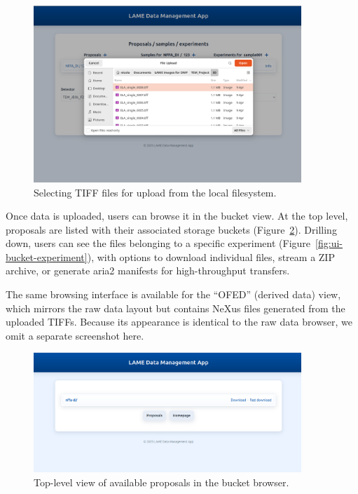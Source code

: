 \begin{figure}[!h]
	\centering
	\includegraphics[width=0.9\textwidth]{img/chpt5/ui_file_picker.png}
	\caption{Selecting TIFF files for upload from the local filesystem.}
	\label{fig:ui-file-picker}
\end{figure}

\FloatBarrier
Once data is uploaded, users can browse it in the bucket view. 
At the top level, proposals are listed with their associated storage buckets 
(Figure~\ref{fig:ui-bucket-top}). 
Drilling down, users can see the files belonging to a specific experiment 
(Figure~\ref{fig:ui-bucket-experiment}), 
with options to download individual files, stream a ZIP archive, or generate 
aria2 manifests for high-throughput transfers.  

The same browsing interface is available for the “OFED” (derived data) view, 
which mirrors the raw data layout but contains NeXus files generated from 
the uploaded TIFFs. Because its appearance is identical to the raw data browser, 
we omit a separate screenshot here.

\begin{figure}[!h]
	\centering
	\includegraphics[width=0.9\textwidth]{img/chpt5/ui_bucket_top.png}
	\caption{Top-level view of available proposals in the bucket browser.}
	\label{fig:ui-bucket-top}
\end{figure}

